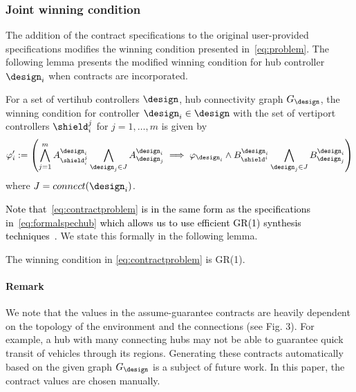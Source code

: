 \subsubsection*{\textbf{Joint winning condition}}
The addition of the contract specifications to the original user-provided specifications modifies the winning condition presented in~\eqref{eq:problem}. The following lemma presents the modified winning condition for hub controller $\design_i$ when contracts are incorporated. 
\begin{lemma}
For a set of vertihub controllers $\design$, hub connectivity graph $G_\design$, the winning condition for controller $\design_i \in \design$ with the set of vertiport controllers $\shield_i^j$ for $j = 1,\ldots,m$ is given by
\begin{equation}\label{eq:contractproblem}
     \varphi_{i}' := \left( \bigwedge_{j=1}^{m} A_{\shield_i^j}^{\design_i} \bigwedge_{\design_j\in J} A_{\design_j}^{\design_i} \implies \varphi_{\design_i} \wedge B_{\shield^i}^{\design_i} \bigwedge_{\design_j\in J} B_{\design_j}^{\design_i} \right)
\end{equation}
where $J = connect(\design_i)$.
\end{lemma}
\textcolor{black}{Note that~\eqref{eq:contractproblem} is in the same form as the specifications in~\eqref{eq:formalspechub} which allows us to use efficient GR(1) synthesis techniques~\cite{bloem2012synthesis}.} We state this formally in the following lemma. 
\begin{lemma}\label{lemma:gr1}
The winning condition in \eqref{eq:contractproblem} is GR(1).
\end{lemma}


\paragraph*{\textbf{Remark}} We note that the values in the assume-guarantee contracts are heavily dependent on the topology of the environment and the connections (see Fig. 3). For example, a hub with many connecting hubs may not be able to guarantee quick transit of vehicles through its regions. Generating these contracts automatically based on the given graph $G_{\design}$ is a subject of future work. In this paper, the contract values are chosen manually. 


